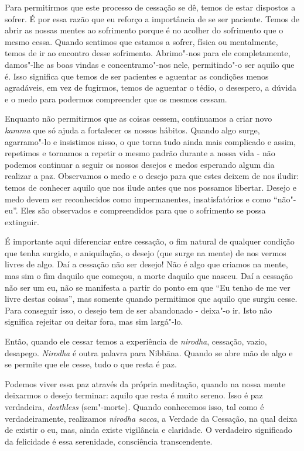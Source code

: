 Para permitirmos que este processo de cessação se dê, temos de estar dispostos a
sofrer. É por essa razão que eu reforço a importância de se ser paciente. Temos
de abrir as nossas mentes ao sofrimento porque é no acolher do sofrimento que o
mesmo cessa. Quando sentimos que estamos a sofrer, física ou mentalmente, temos
de ir ao encontro desse sofrimento. Abrimo"-nos para ele completamente, damos"-lhe
as boas vindas e concentramo"-nos nele, permitindo"-o ser aquilo que é. Isso
significa que temos de ser pacientes e aguentar as condições menos agradáveis,
em vez de fugirmos, temos de aguentar o tédio, o desespero, a dúvida e o medo para
podermos compreender que os mesmos cessam.

Enquanto não permitirmos que as coisas cessem, continuamos a criar novo
\emph{kamma} que só ajuda a fortalecer os nossos hábitos. Quando algo surge,
agarramo"-lo e insistimos nisso, o que torna tudo ainda mais complicado e assim,
repetimos e tornamos a repetir o mesmo padrão durante a nossa vida - não podemos
continuar a seguir os nossos desejos e medos esperando algum dia realizar a paz.
Observamos o medo e o desejo para que estes deixem de nos iludir: temos de
conhecer aquilo que nos ilude antes que nos possamos libertar. Desejo e medo
devem ser reconhecidos como impermanentes, insatisfatórios e como “não"-eu”. Eles
são observados e compreendidos para que o sofrimento se possa extinguir.

É importante aqui diferenciar entre cessação, o fim natural de qualquer condição
que tenha surgido, e aniquilação, o desejo (que surge na mente) de nos vermos
livres de algo. Daí a cessação não ser desejo! Não é algo que criamos na mente,
mas sim o fim daquilo que começou, a morte daquilo que nasceu. Daí a cessação não
ser um eu, não se manifesta a partir do ponto em que “Eu tenho de me ver livre
destas coisas”, mas somente quando permitimos que aquilo que surgiu cesse. Para
conseguir isso, o desejo tem de ser abandonado - deixa"-o ir. Isto não significa
rejeitar ou deitar fora, mas sim largá"-lo.

Então, quando ele cessar temos a experiência de \emph{nirodha}, cessação, vazio,
desapego. \emph{Nirodha} é outra palavra para Nibbāna. Quando se abre mão
de algo e se permite que ele cesse, tudo o que resta é paz.

Podemos viver essa paz através da própria meditação, quando na nossa mente
deixarmos o desejo terminar: aquilo que resta é muito sereno. Isso é paz
verdadeira, \emph{deathless} (sem"-morte). Quando conhecemos isso, tal como é
verdadeiramente, realizamos \emph{nirodha sacca}, a Verdade da Cessação, na qual
deixa de existir o eu, mas, ainda existe vigilância e claridade. O verdadeiro
significado da felicidade é essa serenidade, consciência transcendente.

